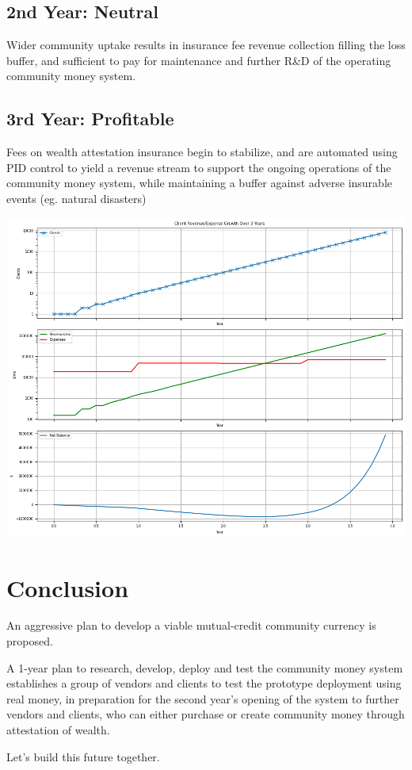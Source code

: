 \documentclass[11pt]{article}
\begin{document}
\subsection{2nd Year: Neutral}
\label{sec:orgc3419a3}

Wider community uptake results in insurance fee revenue collection filling the loss buffer, and
sufficient to pay for maintenance and further R\&D of the operating community money system.

\subsection{3rd Year: Profitable}
\label{sec:orgf76317c}

Fees on wealth attestation insurance begin to stabilize, and are automated using PID control to
yield a revenue stream to support the ongoing operations of the community money system, while
maintaining a buffer against adverse insurable events (eg. natural disasters)

{\scriptsize
\begin{center}
\includegraphics[width=.9\linewidth]{images/revenue-projection.png}
\end{center}

}

\section{Conclusion}
\label{sec:org396e050}

An aggressive plan to develop a viable mutual-credit community currency is proposed.

A 1-year plan to research, develop, deploy and test the community money system establishes a group
of vendors and clients to test the prototype deployment using real money, in preparation for the
second year's opening of the system to further vendors and clients, who can either purchase or
create community money through attestation of wealth.

Let's build this future together.
\end{document}
